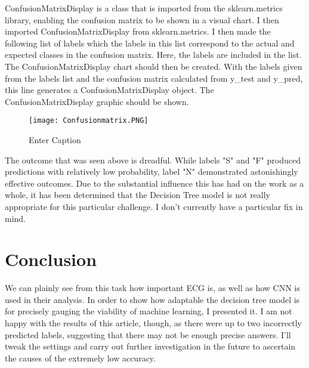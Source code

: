\documentclass{article}
\begin{document}
\begin{multicols}{2}
ConfusionMatrixDisplay is a class that is imported from the sklearn.metrics library, enabling the confusion matrix to be shown in a visual chart. I then imported ConfusionMatrixDisplay from sklearn.metrics. I then made the following list of labels  which the labels in this list correspond to the actual and expected classes in the confusion matrix. Here, the labels  are included in the list. The ConfusionMatrixDisplay chart should then be created. With the labels given from the labels list and the confusion matrix calculated from y\_test and y\_pred, this line generates a ConfusionMatrixDisplay object. The ConfusionMatrixDisplay graphic should be shown.
\begin{figure} [H]
    \centering
    \texttt{[image: Confusionmatrix.PNG]}
    \caption{Enter Caption}
    \label{fig:enter-label}
\end{figure}
 The outcome that was seen above is dreadful. While labels "S" and "F" produced predictions with relatively low probability, label "N" demonstrated astonishingly effective outcomes. Due to the substantial influence this has had on the work as a whole, it has been determined that the Decision Tree model is not really appropriate for this particular challenge.
 I don't currently have a particular fix in mind.

\section{Conclusion}
We can plainly see from this task how important ECG is, as well as how CNN is used in their analysis. In order to show how adaptable the decision tree model is for precisely gauging the viability of machine learning, I presented it. I am not happy with the results of this article, though, as there were up to two incorrectly predicted labels, suggesting that there may not be enough precise answers. I'll tweak the settings and carry out further investigation in the future to ascertain the causes of the extremely low accuracy.






\end{multicols} %
\end{document}

